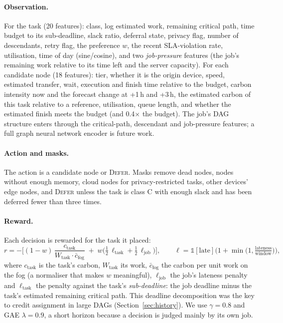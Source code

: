 \documentclass[11pt,a4paper]{article}
\begin{document}
\paragraph{Observation.} For the task (20 features): class, log estimated work, remaining critical path, time budget to its sub-deadline, slack ratio, deferral state, privacy flag, number of descendants, retry flag, the preference $w$, the recent SLA-violation rate, utilisation, time of day (sine/cosine), and two \emph{job-pressure} features (the job's remaining work relative to its time left and the server capacity). For each candidate node (18 features): tier, whether it is the origin device, speed, estimated transfer, wait, execution and finish time relative to the budget, carbon intensity now and the forecast change at +1\,h and +3\,h, the estimated carbon of this task relative to a reference, utilisation, queue length, and whether the estimated finish meets the budget (and 0.4$\times$ the budget). The job's DAG structure enters through the critical-path, descendant and job-pressure features; a full graph neural network encoder is future work.

\paragraph{Action and masks.} The action is a candidate node or \textsc{Defer}. Masks remove dead nodes, nodes without enough memory, cloud nodes for privacy-restricted tasks, other devices' edge nodes, and \textsc{Defer} unless the task is class C with enough slack and has been deferred fewer than three times.

\paragraph{Reward.} Each decision is rewarded for the task it placed:
\begin{equation}
r = -\Big[(1-w)\,\frac{c_{\text{task}}}{W_{\text{task}}\cdot \bar c_{\text{fog}}} \;+\; w\big(\tfrac12\,\ell_{\text{task}} + \tfrac12\,\ell_{\text{job}}\big)\Big],
\qquad \ell = \mathbb{1}[\text{late}]\Big(1+\min\big(1,\tfrac{\text{lateness}}{\text{window}}\big)\Big),
\end{equation}
where $c_{\text{task}}$ is the task's carbon, $W_{\text{task}}$ its work, $\bar c_{\text{fog}}$ the carbon per unit work on the fog (a normaliser that makes $w$ meaningful), $\ell_{\text{job}}$ the job's lateness penalty and $\ell_{\text{task}}$ the penalty against the task's \emph{sub-deadline}: the job deadline minus the task's estimated remaining critical path. This deadline decomposition was the key to credit assignment in large DAGs (Section~\ref{sec:history}). We use $\gamma=0.8$ and GAE $\lambda=0.9$, a short horizon because a decision is judged mainly by its own job.
\end{document}
